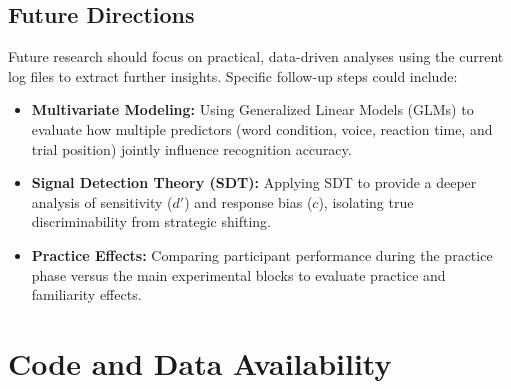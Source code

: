 \documentclass[12pt, a4paper]{article}
\begin{document}
\subsection{Future Directions}

Future research should focus on practical, data-driven analyses using the current log files to extract further insights. Specific follow-up steps could include:

\begin{itemize}
    \item \textbf{Multivariate Modeling:} Using Generalized Linear Models (GLMs) to evaluate how multiple predictors (word condition, voice, reaction time, and trial position) jointly influence recognition accuracy.
    \item \textbf{Signal Detection Theory (SDT):} Applying SDT to provide a deeper analysis of sensitivity ($d'$) and response bias ($c$), isolating true discriminability from strategic shifting.
    \item \textbf{Practice Effects:} Comparing participant performance during the practice phase versus the main experimental blocks to evaluate practice and familiarity effects.
\end{itemize}

\section{Code and Data Availability}
\end{document}
